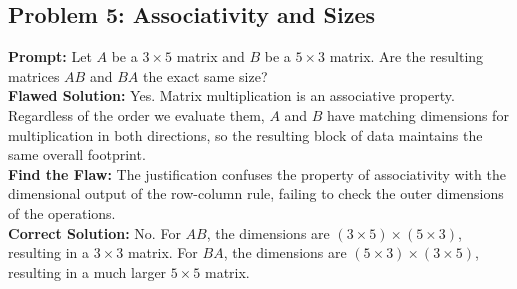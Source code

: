 \documentclass{article}
\begin{document}
\subsection*{Problem 5: Associativity and Sizes}
\textbf{Prompt:} Let $A$ be a $3 \times 5$ matrix and $B$ be a $5 \times 3$ matrix. Are the resulting matrices $AB$ and $BA$ the exact same size? \\
\textbf{Flawed Solution:} 
Yes. Matrix multiplication is an associative property. Regardless of the order we evaluate them, $A$ and $B$ have matching dimensions for multiplication in both directions, so the resulting block of data maintains the same overall footprint. \\
\textbf{Find the Flaw:} The justification confuses the property of associativity with the dimensional output of the row-column rule, failing to check the outer dimensions of the operations. \\
\textbf{Correct Solution:}
No. For $AB$, the dimensions are $(3 \times 5) \times (5 \times 3)$, resulting in a $3 \times 3$ matrix. For $BA$, the dimensions are $(5 \times 3) \times (3 \times 5)$, resulting in a much larger $5 \times 5$ matrix.
\end{document}
